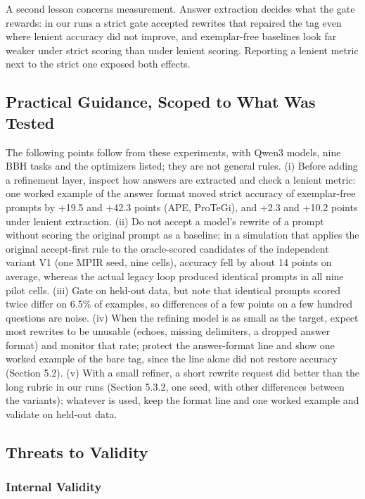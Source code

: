\documentclass{ieeeaccess}
\begin{document}
A second lesson concerns measurement. Answer extraction decides what the gate rewards: in our runs a strict gate accepted rewrites that repaired the tag even where lenient accuracy did not improve, and exemplar-free baselines look far weaker under strict scoring than under lenient scoring. Reporting a lenient metric next to the strict one exposed both effects.

\subsection{Practical Guidance, Scoped to What Was Tested}

The following points follow from these experiments, with Qwen3 models, nine BBH tasks and the optimizers listed; they are not general rules. (i) Before adding a refinement layer, inspect how answers are extracted and check a lenient metric: one worked example of the answer format moved strict accuracy of exemplar-free prompts by +19.5 and +42.3 points (APE, ProTeGi), and +2.3 and +10.2 points under lenient extraction. (ii) Do not accept a model's rewrite of a prompt without scoring the original prompt as a baseline; in a simulation that applies the original accept-first rule to the oracle-scored candidates of the independent variant V1 (one MPIR seed, nine cells), accuracy fell by about 14 points on average, whereas the actual legacy loop produced identical prompts in all nine pilot cells. (iii) Gate on held-out data, but note that identical prompts scored twice differ on 6.5\% of examples, so differences of a few points on a few hundred questions are noise. (iv) When the refining model is as small as the target, expect most rewrites to be unusable (echoes, missing delimiters, a dropped answer format) and monitor that rate; protect the answer-format line and show one worked example of the bare tag, since the line alone did not restore accuracy (Section 5.2). (v) With a small refiner, a short rewrite request did better than the long rubric in our runs (Section 5.3.2, one seed, with other differences between the variants); whatever is used, keep the format line and one worked example and validate on held-out data.

\subsection{Threats to Validity}

\subsubsection{Internal Validity}
\end{document}
